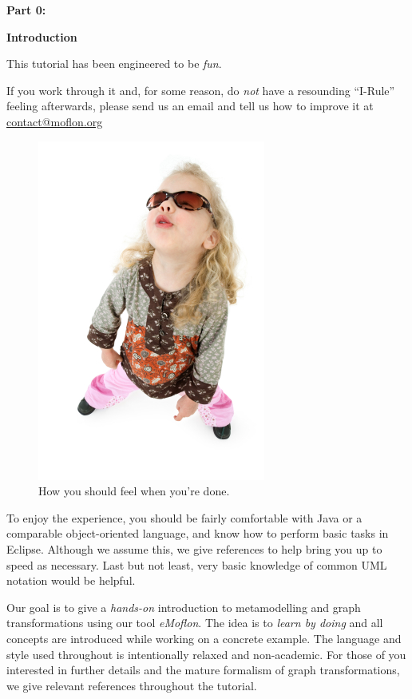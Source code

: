 {\bf \huge Part 0:}

\vspace{1cm}

{\bf \Huge Introduction }

\vspace{2cm}



This tutorial has been engineered to be \emph{fun}.

If you work through it and, for some reason, do \emph{not} have a resounding \mbox{``I-Rule''} feeling afterwards, please send us an email and tell us how to improve it at \href{mailto:contact@moflon.org}{contact@moflon.org}

\begin{figure}[htp]
\begin{center}
	\includegraphics[height=0.45\textheight]{../introduction_images/i-rule}
	\caption{How you should feel when you're done.}
	\label{i-rule}
\end{center}
\end{figure}
\break
 


To enjoy the experience, you should be fairly comfortable with Java or a comparable object-oriented language, and know how to perform basic tasks in Eclipse.  Although we assume this, we give references to help bring you up to speed as necessary.  
Last but not least, very basic knowledge of common UML notation would be helpful.

Our goal is to give a \emph{hands-on} introduction to metamodelling and graph transformations using our tool \emph{eMoflon}.
The idea is to \emph{learn by doing} and all concepts are introduced while working on a concrete example.
The language and style used throughout is intentionally relaxed and non-academic.
For those of you interested in further details and the mature formalism of graph transformations, we give relevant references throughout the tutorial.

